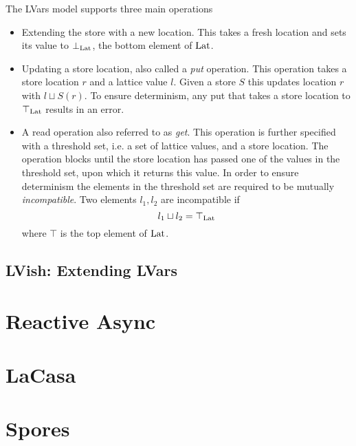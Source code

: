 The LVars model supports three main operations
\begin{itemize}
  \item Extending the store with a new location. This takes a fresh location and
    sets its value to $\bot_{\mathrm{Lat}}$, the bottom element of $\mathrm{Lat}$.
  \item Updating a store location, also called a \emph{put} operation. This
    operation takes a store location $r$ and a lattice value $l$. Given a store
    $S$ this updates location $r$ with $l \sqcup S(r)$. To ensure determinism,
    any put that takes a store location to $\top_{\mathrm{Lat}}$ results in an
    error.
  \item A read operation also referred to as \emph{get}. This operation is
    further specified with a threshold set, i.e. a set of lattice values, and a
    store location. The operation blocks until the store location has passed one
    of the values in the threshold set, upon which it returns this value. In
    order to ensure determinism the elements in the threshold set are required
    to be mutually \emph{incompatible}. Two elements $l_1, l_2$ are incompatible if
    \begin{equation*}
      l_1 \sqcup l_2 = \top_{\mathrm{Lat}}
    \end{equation*}
    where $\top$ is the top element of $\mathrm{Lat}$.
\end{itemize}


\subsection{LVish: Extending LVars}%
\label{sub:lvish_extending_lvars}



\section{Reactive Async}\label{sec:reactive_async}


\section{LaCasa}\label{sec:lacasa}


\section{Spores}\label{sec:spores}




